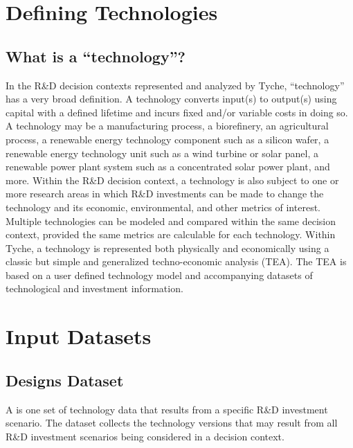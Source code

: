 \documentclass[letterpaper,10pt,english]{sphinxmanual}
\begin{document}
\section{Defining Technologies}
\label{\detokenize{cheat-sheet:defining-technologies}}

\subsection{What is a “technology”?}
\label{\detokenize{cheat-sheet:what-is-a-technology}}
In the R\&D decision contexts represented and analyzed by Tyche, “technology” has a very broad definition. A technology converts input(s) to output(s) using capital with a defined lifetime and incurs fixed and/or variable costs in doing so. A technology may be a manufacturing process, a biorefinery, an agricultural process, a renewable energy technology component such as a silicon wafer, a renewable energy technology unit such as a wind turbine or solar panel, a renewable power plant system such as a concentrated solar power plant, and more. Within the R\&D decision context, a technology is also subject to one or more research areas in which R\&D investments can be made to change the technology and its economic, environmental, and other metrics of interest. Multiple technologies can be modeled and compared within the same decision context, provided the same metrics are calculable for each technology. Within Tyche, a technology is represented both physically and economically using a classic but simple and generalized techno-economic analysis (TEA). The TEA is based on a user defined technology model and accompanying datasets of technological and investment information.


\section{Input Datasets}
\label{\detokenize{cheat-sheet:input-datasets}}

\subsection{Designs Dataset}
\label{\detokenize{cheat-sheet:designs-dataset}}
A  is one set of technology data that results from a specific R\&D investment scenario. The  dataset collects the technology versions that may result from all R\&D investment scenarios being considered in a decision context.
\end{document}
